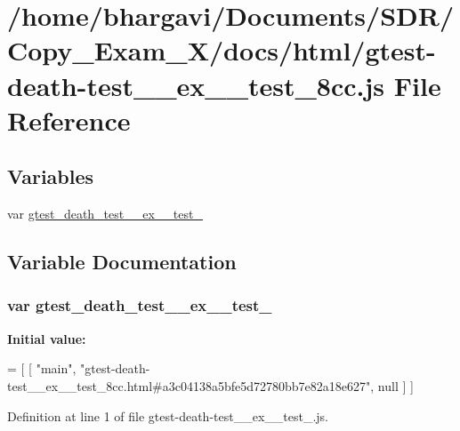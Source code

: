 \hypertarget{gtest-death-test____ex____test__8cc_8js}{}\section{/home/bhargavi/\+Documents/\+S\+D\+R/\+Copy\+\_\+\+Exam\+\_\+X/docs/html/gtest-\/death-\/test\+\_\+\+\_\+ex\+\_\+\+\_\+test\+\_\+8cc.js File Reference}
\label{gtest-death-test____ex____test__8cc_8js}
\subsection*{Variables}
\begin{DoxyCompactItemize}
\item 
var \hyperlink{gtest-death-test____ex____test__8cc_8js_acf7f96f6945dadea4a411bc7ebdedf80}{gtest\+\_\+death\+\_\+test\+\_\+\+\_\+ex\+\_\+\+\_\+test\+\_}
\end{DoxyCompactItemize}


\subsection{Variable Documentation}
\subsubsection[{\texorpdfstring{gtest\+\_\+death\+\_\+test\+\_\+\+\_\+ex\+\_\+\+\_\+test\+\_\+8cc}{gtest_death_test__ex__test_8cc}}]{\setlength{\rightskip}{0pt plus 5cm}var gtest\+\_\+death\+\_\+test\+\_\+\+\_\+ex\+\_\+\+\_\+test\+\_}\hypertarget{gtest-death-test____ex____test__8cc_8js_acf7f96f6945dadea4a411bc7ebdedf80}{}\label{gtest-death-test____ex____test__8cc_8js_acf7f96f6945dadea4a411bc7ebdedf80}
{\bfseries Initial value\+:}
\begin{DoxyCode}
=
[
    [ \textcolor{stringliteral}{"main"}, \textcolor{stringliteral}{"gtest-death-test\_\_ex\_\_test\_8cc.html#a3c04138a5bfe5d72780bb7e82a18e627"}, null ]
]
\end{DoxyCode}


Definition at line 1 of file gtest-\/death-\/test\+\_\+\+\_\+ex\+\_\+\+\_\+test\+\_.\+js.

